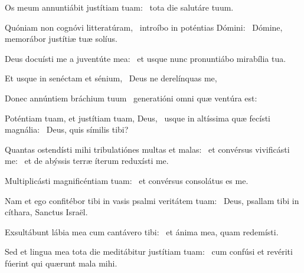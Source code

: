 \item Os meum annuntiábit justítiam tuam:~\psstar{} tota die salutáre tuum.

\item Quóniam non cognóvi litteratúram,~\pscross{} introíbo in poténtias Dómini:~\psstar{} Dómine, memorábor justítiæ tuæ solíus.

\item Deus docuísti me a juventúte mea:~\psstar{} et usque nunc pronuntiábo mirabília tua.

\item Et usque in senéctam et sénium,~\psstar{} Deus ne derelínquas me,

\item Donec annúntiem bráchium tuum~\psstar{} generatióni omni quæ ventúra est:

\item Poténtiam tuam, et justítiam tuam, Deus,~\pscross{} usque in altíssima quæ fecísti magnália:~\psstar{} Deus, quis símilis tibi?

\item Quantas ostendísti mihi tribulatiónes multas et malas:~\pscross{} et convérsus vivificásti me:~\psstar{} et de abýssis terræ íterum reduxísti me.

\item Multiplicásti magnificéntiam tuam:~\psstar{} et convérsus consolátus es me.

\item Nam et ego confitébor tibi in vasis psalmi veritátem tuam:~\psstar{} Deus, psallam tibi in cíthara, Sanctus Israël.

\item Exsultábunt lábia mea cum cantávero tibi:~\psstar{} et ánima mea, quam redemísti.

\item Sed et lingua mea tota die meditábitur justítiam tuam:~\psstar{} cum confúsi et revériti fúerint qui quærunt mala mihi.